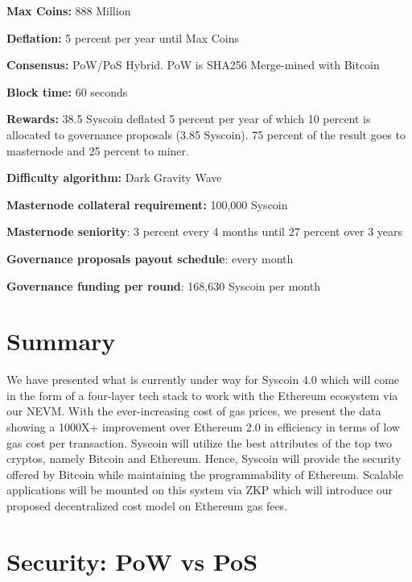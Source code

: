 \documentclass[peerreview]{ieeesyscoin}
\begin{document}
\begin{description}[font=$\bullet$~\normalfont\scshape\color{blue!50!black}]
\item \textbf{Max Coins:} 888 Million
\item \textbf{Deflation:}  5 percent per year until Max Coins
\item \textbf{Consensus:} PoW/PoS Hybrid. PoW is SHA256
Merge-mined with Bitcoin
\item \textbf{Block time:} 60 seconds 
\item \textbf{Rewards:} 38.5 Syscoin deflated 5 percent per year
of which 10 percent is allocated to governance proposals (3.85 Syscoin). 75 percent of the result goes
to masternode and 25 percent to miner.
\item \textbf{Difficulty algorithm:} Dark Gravity Wave
\item \textbf{Masternode collateral requirement:} 100,000 Syscoin
\item \textbf{Masternode seniority}: 3 percent every 4 months until
27 percent over 3 years
\item \textbf{Governance proposals payout schedule}: every month
\item \textbf{Governance funding per round}: 168,630 Syscoin per
month
\end{description}


\section{Summary}
\label{section:summary}
We have presented what is currently under way for Syscoin 4.0 which will come in the form of a four-layer tech stack to work with the Ethereum ecosystem via our NEVM. With the ever-increasing cost of gas prices, we present the data showing a 1000X+ improvement over Ethereum 2.0 in efficiency in terms of low gas cost per transaction. Syscoin will utilize the best attributes of the top two cryptos, namely Bitcoin and Ethereum. Hence, Syscoin will provide the security offered by Bitcoin while maintaining the programmability of Ethereum. Scalable applications will be mounted on this system via ZKP which will introduce our proposed decentralized cost model on Ethereum gas fees.

\appendices

\section{Security: PoW vs PoS}
\end{document}
